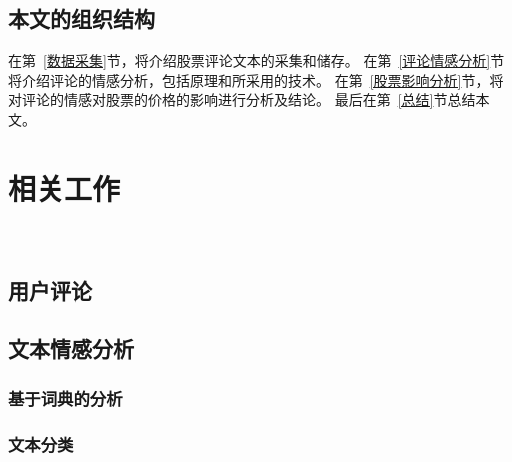 \documentclass[cs4size,a4paper]{ctexart}
\numberwithin{equation}{section}
\numberwithin{table}{section}
\numberwithin{figure}{section}
\newcommand{\upcite}[1]{\textsuperscript{\textsuperscript{\cite{#1}}}}%
\begin{document}
\subsection{本文的组织结构}

在第~\ref{数据采集}节，将介绍股票评论文本的采集和储存。
在第~\ref{评论情感分析}节将介绍评论的情感分析，包括原理和所采用的技术。
在第~\ref{股票影响分析}节，将对评论的情感对股票的价格的影响进行分析及结论。
最后在第~\ref{总结}节总结本文。

\section{相关工作}~\label{related-work}

\subsection{用户评论}


\subsection{文本情感分析}



\subsubsection{基于词典的分析}



\subsubsection{文本分类}
\end{document}
